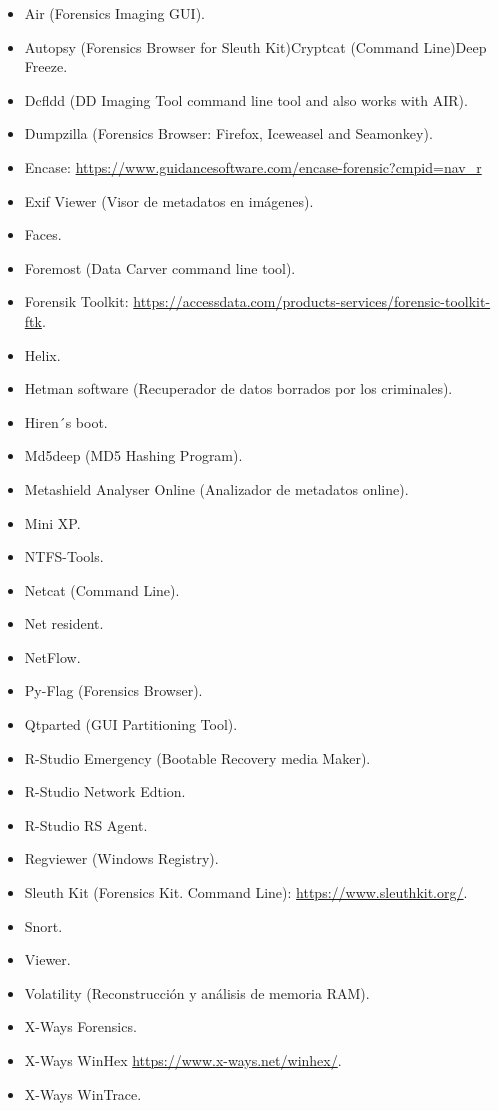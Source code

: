 \begin{itemize}
    \item Air (Forensics Imaging GUI).
    \item Autopsy (Forensics Browser for Sleuth Kit)Cryptcat (Command Line)Deep Freeze.
    \item Dcfldd (DD Imaging Tool command line tool and also works with AIR).
    \item Dumpzilla (Forensics Browser: Firefox, Iceweasel and Seamonkey).
    \item Encase: \url{https://www.guidancesoftware.com/encase-forensic?cmpid=nav_r}
    \item Exif Viewer (Visor de metadatos en imágenes).
    \item Faces.
    \item Foremost (Data Carver command line tool).
    \item Forensik Toolkit: \url{https://accessdata.com/products-services/forensic-toolkit-ftk}.
    \item Helix.
    \item Hetman software (Recuperador de datos borrados por los criminales).
    \item Hiren´s boot.
    \item Md5deep (MD5 Hashing Program).
    \item Metashield Analyser Online (Analizador de metadatos online).
    \item Mini XP.
    \item NTFS-Tools.
    \item Netcat (Command Line).
    \item Net resident.
    \item NetFlow.
    \item Py-Flag (Forensics Browser).
    \item Qtparted (GUI Partitioning Tool).
    \item R-Studio Emergency (Bootable Recovery media Maker).
    \item R-Studio Network Edtion.
    \item R-Studio RS Agent.
    \item Regviewer (Windows Registry).
    \item Sleuth Kit (Forensics Kit. Command Line): \url{https://www.sleuthkit.org/}.
    \item Snort.
    \item Viewer.
    \item Volatility (Reconstrucción y análisis de memoria RAM).
    \item X-Ways Forensics.
    \item X-Ways WinHex \url{https://www.x-ways.net/winhex/}.
    \item X-Ways WinTrace.
\end{itemize}


